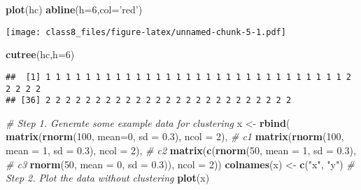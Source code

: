 \documentclass[]{article}
\newenvironment{Shaded}{\begin{snugshade}}{\end{snugshade}}
\newcommand{\KeywordTok}[1]{\textcolor[rgb]{0.13,0.29,0.53}{\textbf{#1}}}
\newcommand{\DataTypeTok}[1]{\textcolor[rgb]{0.13,0.29,0.53}{#1}}
\newcommand{\DecValTok}[1]{\textcolor[rgb]{0.00,0.00,0.81}{#1}}
\newcommand{\FloatTok}[1]{\textcolor[rgb]{0.00,0.00,0.81}{#1}}
\newcommand{\StringTok}[1]{\textcolor[rgb]{0.31,0.60,0.02}{#1}}
\newcommand{\CommentTok}[1]{\textcolor[rgb]{0.56,0.35,0.01}{\textit{#1}}}
\newcommand{\NormalTok}[1]{#1}
\begin{document}
\begin{Shaded}
\begin{Highlighting}[]
\KeywordTok{plot}\NormalTok{(hc)}
\KeywordTok{abline}\NormalTok{(}\DataTypeTok{h=}\DecValTok{6}\NormalTok{,}\DataTypeTok{col=}\StringTok{'red'}\NormalTok{)}
\end{Highlighting}
\end{Shaded}

\texttt{[image: class8\_files/figure-latex/unnamed-chunk-5-1.pdf]}

\begin{Shaded}
\begin{Highlighting}[]
\KeywordTok{cutree}\NormalTok{(hc,}\DataTypeTok{h=}\DecValTok{6}\NormalTok{)}
\end{Highlighting}
\end{Shaded}

\begin{verbatim}
##  [1] 1 1 1 1 1 1 1 1 1 1 1 1 1 1 1 1 1 1 1 1 1 1 1 1 1 1 1 1 1 1 2 2 2 2 2
## [36] 2 2 2 2 2 2 2 2 2 2 2 2 2 2 2 2 2 2 2 2 2 2 2 2 2
\end{verbatim}

\begin{Shaded}
\begin{Highlighting}[]
 \CommentTok{# Step 1. Generate some example data for clustering}
\NormalTok{x <-}\StringTok{ }\KeywordTok{rbind}\NormalTok{(}
  \KeywordTok{matrix}\NormalTok{(}\KeywordTok{rnorm}\NormalTok{(}\DecValTok{100}\NormalTok{, }\DataTypeTok{mean=}\DecValTok{0}\NormalTok{, }\DataTypeTok{sd =} \FloatTok{0.3}\NormalTok{), }\DataTypeTok{ncol =} \DecValTok{2}\NormalTok{),   }\CommentTok{# c1}
  \KeywordTok{matrix}\NormalTok{(}\KeywordTok{rnorm}\NormalTok{(}\DecValTok{100}\NormalTok{, }\DataTypeTok{mean =} \DecValTok{1}\NormalTok{, }\DataTypeTok{sd =} \FloatTok{0.3}\NormalTok{), }\DataTypeTok{ncol =} \DecValTok{2}\NormalTok{), }\CommentTok{# c2}
  \KeywordTok{matrix}\NormalTok{(}\KeywordTok{c}\NormalTok{(}\KeywordTok{rnorm}\NormalTok{(}\DecValTok{50}\NormalTok{, }\DataTypeTok{mean =} \DecValTok{1}\NormalTok{, }\DataTypeTok{sd =} \FloatTok{0.3}\NormalTok{),           }\CommentTok{# c3}
           \KeywordTok{rnorm}\NormalTok{(}\DecValTok{50}\NormalTok{, }\DataTypeTok{mean =} \DecValTok{0}\NormalTok{, }\DataTypeTok{sd =} \FloatTok{0.3}\NormalTok{)), }\DataTypeTok{ncol =} \DecValTok{2}\NormalTok{))}
\KeywordTok{colnames}\NormalTok{(x) <-}\StringTok{ }\KeywordTok{c}\NormalTok{(}\StringTok{"x"}\NormalTok{, }\StringTok{"y"}\NormalTok{)}
\CommentTok{# Step 2. Plot the data without clustering}
\KeywordTok{plot}\NormalTok{(x)}
\end{Highlighting}
\end{Shaded}
\end{document}
